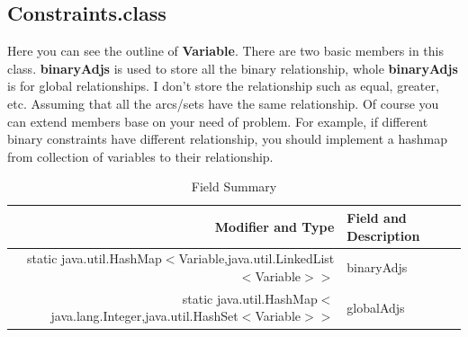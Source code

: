 \documentclass{article}
\begin{document}
\subsection{Constraints.class}

Here you can see the outline of \textbf{Variable}. There are two basic members in this class. \textbf{binaryAdjs} is used to store all the binary relationship, whole \textbf{binaryAdjs} is for global relationships. I don't store the relationship such as equal, greater, etc. Assuming that all the arcs/sets have the same relationship. Of course you can extend members base on your need of problem. For example, if different binary constraints have different relationship, you should implement a hashmap from collection of variables to their relationship.



\begin{table}[h]
\begin{center}
  \begin{tabular}{ |r | l | }
    \hline
    Modifier and Type & Field and Description \\ \hline
static java.util.HashMap$<$Variable,java.util.LinkedList$<$Variable$>$$>$	&binaryAdjs  \\ \hline
static java.util.HashMap$<$java.lang.Integer,java.util.HashSet$<$Variable$>$$>$	&globalAdjs  \\ \hline

  \end{tabular}
\caption{Field Summary}
\end{center}
\end{table}
\end{document}
